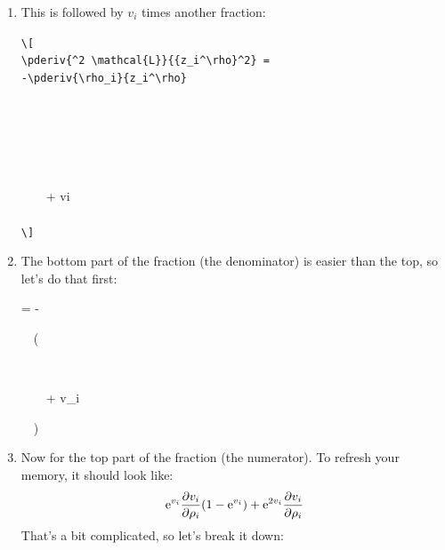 \begin{enumerate}
\item This is followed by $v_i$ times another fraction:
\begin{code}\par\noindent
{\color{midgray}\verb|\[|\\
\verb|\pderiv{^2 \mathcal{L}}{{z_i^\rho}^2} =|\\
\verb|-\pderiv{\rho_i}{z_i^\rho}|\\
\strut~~\\
\strut~~~~ }\\
\strut~~~~+ vi \marg{}\marg{}\\
{\color{midgray}~~\\
\color{midgray}\verb|\]|}
\end{code}

\item The bottom part of the
fraction (the denominator) is easier than the top, so let's do that first:
\begin{code}
\color{midgray}\newline
{} =\newline
-\newline
\strut~~(\newline
\strut~~~~ \newline
\strut~~~~+ v\_i \marg*{}\newline
\strut~~)\newline
{}
\color{black}
\end{code}

\breakenumi

\item Now for the top part of the fraction (the numerator).
To refresh your memory, it should look like:
\[
\mathrm{e}^{v_i}\frac{\partial v_i}{\partial \rho_i}(1-\mathrm{e}^{v_i})
+ \mathrm{e}^{2v_i}\frac{\partial v_i}{\partial \rho_i}
\]
That's a bit
complicated, so let's break it down:


\end{enumerate}

